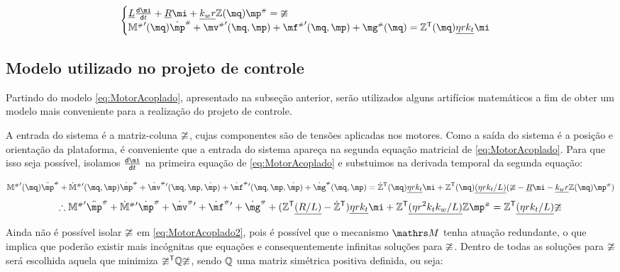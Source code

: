 \documentclass[a4paper,11pt,brazil,fleqn]{article}
\begin{document}
\begin{equation} \label{eq:MotorAcoplado}
\begin{cases}
\underline{L} \frac{\dd \mi}{\dd t} + \underline{R} \mi + \underline{k_w r} \mZ (\mq) \mp\ssh = \mup
\\
{\mM\ssh}'(\mq) \dot{\mp}\ssh + {\mv\ssh}'(\mq,\mp) + {\mf\ssh}'(\mq,\mp) + {\mg\ssh}(\mq) = \mZ^\msT (\mq) \underline{\eta r k_t} \mi
\end{cases}
\end{equation}

\subsection{Modelo utilizado no projeto de controle}\label{S04-5}

Partindo do modelo \eqref{eq:MotorAcoplado}, apresentado na subse\c{c}\~ao anterior, ser\~ao utilizados alguns artif\'icios matem\'aticos a fim de obter um modelo mais conveniente para a realiza\c{c}\~ao do projeto de controle.

A entrada do sistema \'e a matriz-coluna $\mathbb{\upsilon}$, cujas componentes s\~ao de tens\~oes aplicadas nos motores. Como a sa\'ida do sistema \'e a posi\c{c}\~ao e orienta\c{c}\~ao da plataforma, \'e conveniente que a entrada do sistema apare\c{c}a na segunda equa\c{c}\~ao matricial de \eqref{eq:MotorAcoplado}. Para que isso seja poss\'ivel, isolamos $\frac{\dd \mi}{\dd t}$ na primeira equa\c{c}\~ao de \eqref{eq:MotorAcoplado} e substuimos na derivada temporal da segunda equa\c{c}\~ao:

\begin{equation}
{\mM\ssh}'(\mq) \ddot{\mp}\ssh + {{\dot{\mM}}\ssh}{'} (\mq,\mp) \dot{\mp}\ssh + {\dot{\mv}\ssh}{'}(\mq,\mp,\dot{\mp}) + {\dot{\mf}\ssh}{'}(\mq,\mp,\dot{\mp}) + {\dot{\mg}\ssh}(\mq,\mp) = \dot{\mZ}^\msT (\mq) \underline{\eta r k_t} \mi + \mZ^\msT (\mq) \underline{(\eta r k_t / L)} ( \mup -  \underline{R} \mi - \underline{k_w r} \mZ (\mq) \mp\ssh )
\end{equation}
\begin{equation} \label{eq:MotorAcoplado2}
\therefore {\mM\ssh}' \ddot{\mp}\ssh + {{\dot{\mM}}\ssh}{'} \dot{\mp}\ssh + {\dot{\mv}\ssh}{'} + {\dot{\mf}\ssh}{'} + {\dot{\mg}\ssh} + ( \mZ^\msT  \underline{(R/L)} - \dot{\mZ}^\msT ) \underline{\eta r k_t} \mi + \mZ^\msT  \underline{(\eta r^2 k_t k_w / L)}  \mZ \mp\ssh =  \mZ^\msT  \underline{(\eta r k_t / L)} \mup
\end{equation}

Ainda n\~ao \'e poss\'ivel isolar $\mathbb{\upsilon}$ em \eqref{eq:MotorAcoplado2}, pois \'e poss\'ivel que o mecanismo $\ssM$ tenha atua\c{c}\~ao redundante, o que implica que poder\~ao existir mais inc\'ognitas que equa\c{c}\~oes e consequentemente infinitas solu\c{c}\~oes para $\mathbb{\upsilon}$. Dentro de todas as solu\c{c}\~oes para $\mathbb{\upsilon}$ ser\'a escolhida aquela que minimiza $\mathbb{\upsilon}^{\mathsf{T}} \mathbb{Q} \mathbb{\upsilon}$, sendo $\mathbb{Q}$ uma matriz sim\'etrica positiva definida, ou seja:
\end{document}
